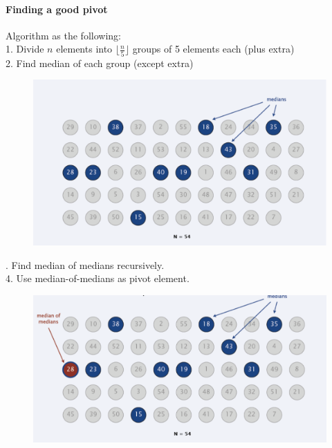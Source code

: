 \documentclass[11pt]{article}
\begin{document}
\paragraph{Finding a good pivot}
Algorithm as the following: \\
1. Divide $n$ elements into $\lfloor \frac{n}{5} \rfloor$ groups of 5 elements each (plus extra)\\
2. Find median of each group (except extra) 
\begin{figure}[h]
	\centering
	\includegraphics[scale=0.5]{p6}
\end{figure}

. Find median of medians recursively. \\
4. Use median-of-medians as pivot element.\\

\begin{figure}[h]
	\centering
	\includegraphics[scale=0.5]{p7}
\end{figure}
\end{document}
